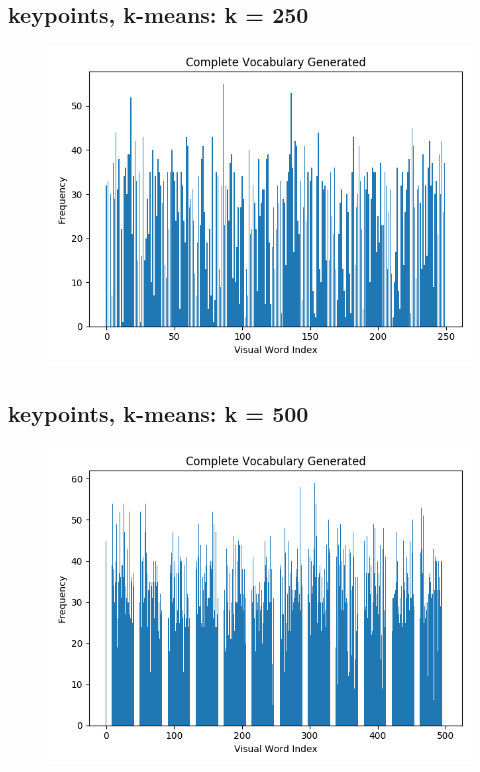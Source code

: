 \subsection*{keypoints, k-means: k = 250}
\begin{figure}[H]
    \centering
    \includegraphics[width=\textwidth]{images/bow-kp-250.png}
\end{figure}

\subsection*{keypoints, k-means: k = 500}
\begin{figure}[H]
    \centering
    \includegraphics[width=\textwidth]{images/bow-kp-500.png}
\end{figure}

